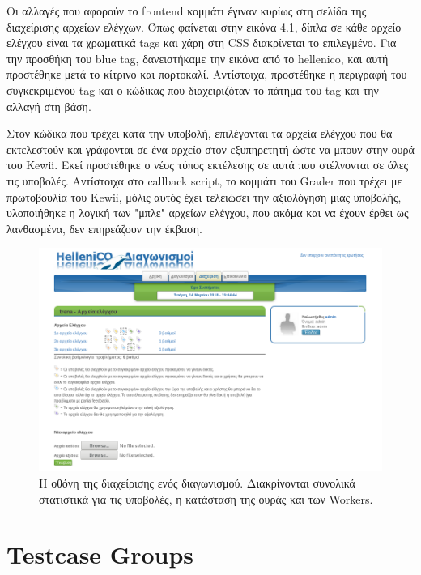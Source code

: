 \documentclass[diploma]{softlab-thesis}
\begin{document}
\bigskip

Οι αλλαγές που αφορούν το frontend κομμάτι έγιναν κυρίως στη σελίδα της διαχείρισης
αρχείων ελέγχων. Όπως φαίνεται στην εικόνα 4.1, δίπλα σε κάθε αρχείο ελέγχου είναι
τα χρωματικά tags και χάρη στη CSS διακρίνεται το επιλεγμένο. Για την προσθήκη
του blue tag, δανειστήκαμε την εικόνα από το hellenico, και αυτή προστέθηκε μετά
το κίτρινο και πορτοκαλί. Αντίστοιχα, προστέθηκε η περιγραφή του συγκεκριμένου
tag και ο κώδικας που διαχειριζόταν το πάτημα του tag και την αλλαγή στη βάση.

\bigskip

Στον κώδικα που τρέχει κατά την υποβολή, επιλέγονται τα αρχεία ελέγχου που θα
εκτελεστούν και γράφονται σε ένα αρχείο στον εξυπηρετητή ώστε να μπουν στην
ουρά του Kewii. Εκεί προστέθηκε ο νέος τύπος εκτέλεσης σε αυτά που στέλνονται
σε όλες τις υποβολές. Αντίστοιχα στο callback script, το κομμάτι του Grader που
τρέχει με πρωτοβουλία του Kewii, μόλις αυτός έχει τελειώσει την αξιολόγηση μιας
υποβολής, υλοποιήθηκε η λογική των "μπλε" αρχείων ελέγχου, που ακόμα και να
έχουν έρθει ως λανθασμένα, δεν επηρεάζουν την έκβαση.

\begin{figure}
  \centering
  \includegraphics[scale=0.3,trim=4 4 4 4,clip]{Figures/bluetag.png}
  \caption[Οθόνη διαχείρισης προβλήματος]{Η οθόνη της διαχείρισης ενός διαγωνισμού.
  Διακρίνονται συνολικά στατιστικά για τις υποβολές, η κατάσταση της ουράς και των
  Workers.}
\end{figure}

\section{Testcase Groups}
\end{document}
